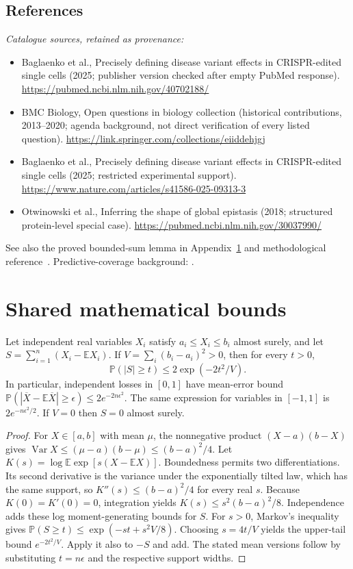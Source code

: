 \documentclass[11pt]{article}
\begin{document}
\subsection{References}
\noindent\emph{Catalogue sources, retained as provenance:}
\begin{itemize}
\item Baglaenko et al., Precisely defining disease variant effects in CRISPR-edited single cells (2025; publisher version checked after empty PubMed response). \url{https://pubmed.ncbi.nlm.nih.gov/40702188/}
\item BMC Biology, Open questions in biology collection (historical contributions, 2013--2020; agenda background, not direct verification of every listed question). \url{https://link.springer.com/collections/eiiddehjgj}
\item Baglaenko et al., Precisely defining disease variant effects in CRISPR-edited single cells (2025; restricted experimental support). \url{https://www.nature.com/articles/s41586-025-09313-3}
\item Otwinowski et al., Inferring the shape of global epistasis (2018; structured protein-level special case). \url{https://pubmed.ncbi.nlm.nih.gov/30037990/}
\end{itemize}
\noindent See also the proved bounded-sum lemma in Appendix~\ref{app:bounds} and methodological reference~\cite{hoeffding}.
\noindent Predictive-coverage background: \cite{lei}.




\section{Shared mathematical bounds}\label{app:bounds}
\begin{lemma}\label{lem:bounded}
Let independent real variables $X_i$ satisfy $a_i\leq X_i\leq b_i$ almost surely,
and let $S=\sum_{i=1}^n(X_i-\mathbb{E} X_i)$. If
$V=\sum_i(b_i-a_i)^2>0$, then for every $t>0$,
\[
 \mathbb{P}(|S|\geq t)\leq 2\exp(-2t^2/V).
\]
In particular, independent losses in $[0,1]$ have mean-error bound
$\mathbb{P}(|\overline X-\mathbb{E}\overline X|\geq\epsilon)
\leq2e^{-2n\epsilon^2}$. The same expression for variables in $[-1,1]$
is $2e^{-n\epsilon^2/2}$. If $V=0$ then $S=0$ almost surely.
\end{lemma}
\begin{proof}
For $X\in[a,b]$ with mean $\mu$, the nonnegative product
$(X-a)(b-X)$ gives
$\operatorname{Var} X\leq(\mu-a)(b-\mu)\leq(b-a)^2/4$.
Let $K(s)=\log\mathbb{E}\exp[s(X-\mathbb{E} X)]$.
Boundedness permits two differentiations. Its second derivative is the variance
under the exponentially tilted law, which has the same support, so
$K''(s)\leq(b-a)^2/4$ for every real $s$.
Because $K(0)=K'(0)=0$, integration yields
$K(s)\leq s^2(b-a)^2/8$.
Independence adds these log moment-generating bounds for $S$.
For $s>0$, Markov's inequality gives
$\mathbb{P}(S\geq t)\leq\exp(-st+s^2V/8)$.
Choosing $s=4t/V$ yields the upper-tail bound $e^{-2t^2/V}$.
Apply it also to $-S$ and add. The stated mean versions follow by substituting
$t=n\epsilon$ and the respective support widths.
\end{proof}
\end{document}
